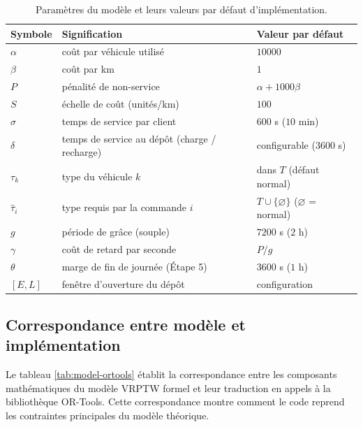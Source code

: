 \documentclass[12pt,a4paper]{report}
\begin{document}
\begin{table}[H]
\centering
\begin{tabular}{@{}lll@{}}
\toprule
\textbf{Symbole} & \textbf{Signification} & \textbf{Valeur par défaut} \\
\midrule
$\alpha$ & coût par véhicule utilisé    & $10000$ \\
$\beta$  & coût par km                  & $1$ \\
$P$      & pénalité de non-service      & $\alpha + 1000\beta$ \\
$S$      & échelle de coût (unités/km)  & $100$ \\
$\sigma$ & temps de service par client  & $600$ s ($10$ min) \\
$\delta$ & temps de service au dépôt (charge / recharge) & configurable ($3600$ s) \\
$\tau_k$ & type du véhicule $k$         & dans $T$ (défaut normal) \\
$\hat{\tau}_i$ & type requis par la commande $i$ & $T \cup \{\varnothing\}$ ($\varnothing$ = normal) \\
$g$      & période de grâce (souple)    & $7200$ s ($2$ h) \\
$\gamma$ & coût de retard par seconde   & $P / g$ \\
$\theta$ & marge de fin de journée (Étape 5) & $3600$ s ($1$ h) \\
$[E,L]$  & fenêtre d'ouverture du dépôt & configuration \\
\bottomrule
\end{tabular}
\caption{Paramètres du modèle et leurs valeurs par défaut d'implémentation.}
\end{table}

\subsection{Correspondance entre modèle et implémentation}

Le tableau \ref{tab:model-ortools} établit la correspondance entre les composants mathématiques du modèle VRPTW formel et leur traduction en appels à la bibliothèque OR-Tools. Cette correspondance montre comment le code reprend les contraintes principales du modèle théorique.
\end{document}
